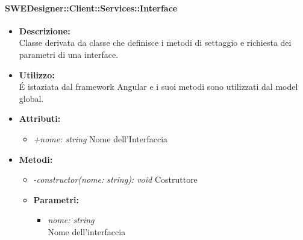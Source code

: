           	\paragraph{SWEDesigner::Client::Services::Interface}
				\begin{itemize}
          			\item \textbf{Descrizione:}\\
          			Classe derivata da classe che definisce i metodi di settaggio e richiesta dei parametri di una interface.
          			\item \textbf{Utilizzo:}\\
          			É istaziata dal framework Angular e i suoi metodi sono utilizzati dal model global.
          			\item \textbf{Attributi:}\\
          			\begin{itemize}
          				\item \emph{+nome: string}
          				Nome dell'Interfaccia
          			\end{itemize}
          			\item \textbf{Metodi:}\\
          			\begin{itemize}
          				\item \emph{-constructor(nome: string): void}
          				Costruttore
          				\item \textbf{Parametri:}\\
            				\begin{itemize}
            					\item \emph{nome: string}\\
            					Nome dell'interfaccia
            				\end{itemize}
          			\end{itemize}
          		\end{itemize}
